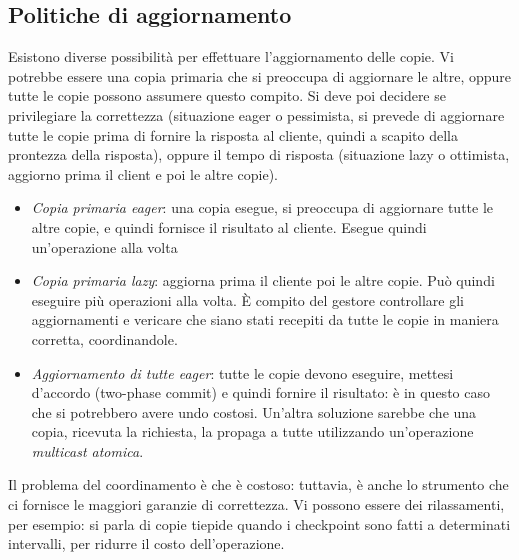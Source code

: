\subsection{Politiche di aggiornamento}
Esistono diverse possibilità per effettuare l'aggiornamento delle copie. Vi potrebbe essere una copia primaria che si
preoccupa di aggiornare le altre, oppure tutte le copie possono assumere questo compito. Si deve poi decidere se
privilegiare la correttezza (situazione eager o pessimista, si prevede di aggiornare tutte le copie prima di fornire
la risposta al cliente, quindi a scapito della prontezza della risposta), oppure il tempo di risposta (situazione 
lazy o ottimista, aggiorno prima il client e poi le altre copie).
\begin{itemize}
 \item \textit{Copia primaria eager}: una copia esegue, si preoccupa di aggiornare tutte le altre copie, e quindi
 fornisce il risultato al cliente. Esegue quindi un'operazione alla volta
 \item \textit{Copia primaria lazy}: aggiorna prima il cliente poi le altre copie. Può quindi eseguire più operazioni
 alla volta. È compito del gestore controllare gli aggiornamenti e vericare che siano stati recepiti da tutte le copie
 in maniera corretta, coordinandole.
 \item \textit{Aggiornamento di tutte eager}: tutte le copie devono eseguire, mettesi d'accordo (two-phase commit) e
 quindi fornire il risultato: è in questo caso che si potrebbero avere undo costosi. Un'altra soluzione sarebbe che
 una copia, ricevuta la richiesta, la propaga a tutte utilizzando un'operazione \textit{multicast atomica}.
\end{itemize}
Il problema del coordinamento è che è costoso: tuttavia, è anche lo strumento che ci fornisce le maggiori garanzie di
correttezza. Vi possono essere dei rilassamenti, per esempio: si parla di copie tiepide quando i checkpoint sono fatti
a determinati intervalli, per ridurre il costo dell'operazione.
